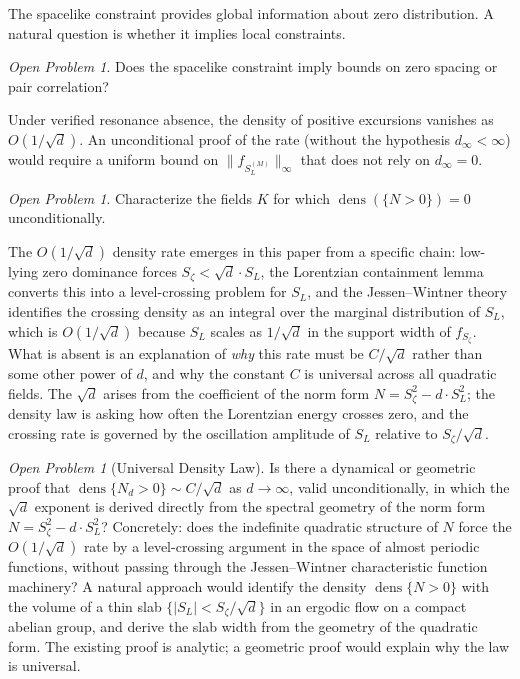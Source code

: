 \documentclass[12pt,reqno]{amsart}
\theoremstyle{plain}
\theoremstyle{definition}
\theoremstyle{remark}
\newtheorem{openproblem}[theorem]{Open Problem}
\DeclareMathOperator{\dens}{dens}
\begin{document}
The spacelike constraint provides global information about zero distribution. A natural question is whether it implies local constraints.

\begin{openproblem}
Does the spacelike constraint imply bounds on zero spacing or pair correlation?
\end{openproblem}

Under verified resonance absence, the density of positive excursions vanishes as $O(1/\sqrt{d})$.  An unconditional proof of the rate (without the hypothesis $d_\infty < \infty$) would require a uniform bound on $\|f_{S_L^{(M)}}\|_\infty$ that does not rely on $d_\infty = 0$.

\begin{openproblem}
Characterize the fields $K$ for which $\dens(\{N > 0\}) = 0$ unconditionally.
\end{openproblem}

The $O(1/\sqrt{d})$ density rate emerges in this paper from a specific chain: low-lying zero dominance forces $S_\zeta < \sqrt{d}\cdot S_L$, the Lorentzian containment lemma converts this into a level-crossing problem for $S_L$, and the Jessen--Wintner theory identifies the crossing density as an integral over the marginal distribution of $S_L$, which is $O(1/\sqrt{d})$ because $S_L$ scales as $1/\sqrt{d}$ in the support width of $f_{S_\zeta}$.  What is absent is an explanation of \emph{why} this rate must be $C/\sqrt{d}$ rather than some other power of $d$, and why the constant $C$ is universal across all quadratic fields.  The $\sqrt{d}$ arises from the coefficient of the norm form $N = S_\zeta^2 - d \cdot S_L^2$; the density law is asking how often the Lorentzian energy crosses zero, and the crossing rate is governed by the oscillation amplitude of $S_L$ relative to $S_\zeta/\sqrt{d}$.

\begin{openproblem}[Universal Density Law]\label{op:universal-density}
Is there a dynamical or geometric proof that $\dens\{N_d > 0\} \sim C/\sqrt{d}$ as $d \to \infty$, valid unconditionally, in which the $\sqrt{d}$ exponent is derived directly from the spectral geometry of the norm form $N = S_\zeta^2 - d\cdot S_L^2$?  Concretely: does the indefinite quadratic structure of $N$ force the $O(1/\sqrt{d})$ rate by a level-crossing argument in the space of almost periodic functions, without passing through the Jessen--Wintner characteristic function machinery?  A natural approach would identify the density $\dens\{N > 0\}$ with the volume of a thin slab $\{|S_L| < S_\zeta/\sqrt{d}\}$ in an ergodic flow on a compact abelian group, and derive the slab width from the geometry of the quadratic form.  The existing proof is analytic; a geometric proof would explain why the law is universal.
\end{openproblem}
\end{document}
